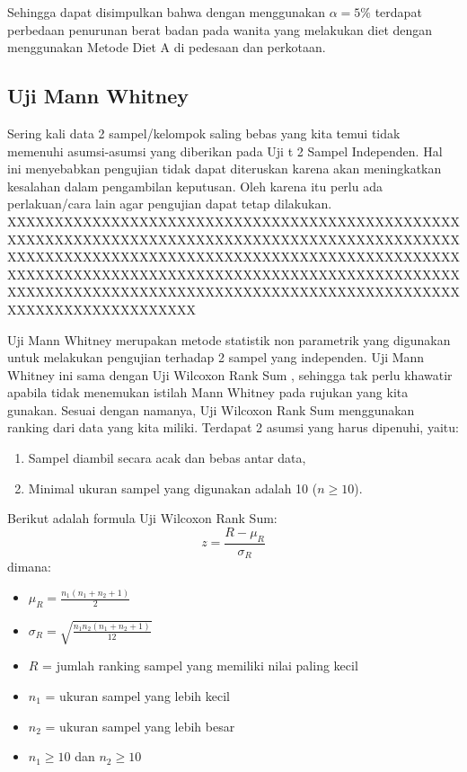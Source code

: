 \documentclass[
]{book}
\providecommand{\tightlist}{%
  \setlength{\itemsep}{0pt}\setlength{\parskip}{0pt}}
\begin{document}
Sehingga dapat disimpulkan bahwa dengan menggunakan \(\alpha = 5\%\) terdapat perbedaan penurunan berat badan pada wanita yang melakukan diet dengan menggunakan Metode Diet A di pedesaan dan perkotaan.

\hypertarget{uji-mann-whitney}{%
\subsection{Uji Mann Whitney}\label{uji-mann-whitney}}

Sering kali data 2 sampel/kelompok saling bebas yang kita temui tidak memenuhi asumsi-asumsi yang diberikan pada Uji t 2 Sampel Independen. Hal ini menyebabkan pengujian tidak dapat diteruskan karena akan meningkatkan kesalahan dalam pengambilan keputusan. Oleh karena itu perlu ada perlakuan/cara lain agar pengujian dapat tetap dilakukan. XXXXXXXXXXXXXXXXXXXXXXXXXXXXXXXXXXXXXXXXXXXXXXXXXXXXXXXXXXXXXXXXXXXXXXXXXXXXXXXXXXXXXXXXXXXXXXXXXXXXXXXXXXXXXXXXXXXXXXXXXXXXXXXXXXXXXXXXXXXXXXXXXXXXXXXXXXXXXXXXXXXXXXXXXXXXXXXXXXXXXXXXXXXXXXXXXXXXXXXXXXXXXXXXXXXXXXXXXXXXXXXXXXXXXXXXXXXXXXXXXXXXXXXXXXXXXXXXXXXX

Uji Mann Whitney merupakan metode statistik non parametrik yang digunakan untuk melakukan pengujian terhadap 2 sampel yang independen. Uji Mann Whitney ini sama dengan Uji Wilcoxon Rank Sum \citep{chalmer19}, sehingga tak perlu khawatir apabila tidak menemukan istilah Mann Whitney pada rujukan yang kita gunakan. Sesuai dengan namanya, Uji Wilcoxon Rank Sum menggunakan ranking dari data yang kita miliki. Terdapat 2 asumsi yang harus dipenuhi, yaitu:

\begin{enumerate}
\def\labelenumi{\arabic{enumi}.}
\tightlist
\item
  Sampel diambil secara acak dan bebas antar data,
\item
  Minimal ukuran sampel yang digunakan adalah 10 (\(n \geq 10\)). \citep{allan18}
\end{enumerate}

Berikut adalah formula Uji Wilcoxon Rank Sum:
\[
z = \frac{R-\mu_R}{\sigma_R}
\]
dimana:

\begin{itemize}
\tightlist
\item
  \(\mu_R=\frac{n_1(n_1+n_2+1)}{2}\)
\item
  \(\sigma_R=\sqrt{\frac{n_1 n_2 (n_1+n_2+1)}{12}}\)
\item
  \(R\) = jumlah ranking sampel yang memiliki nilai paling kecil
\item
  \(n_1\) = ukuran sampel yang lebih kecil
\item
  \(n_2\) = ukuran sampel yang lebih besar
\item
  \(n_1 \geq 10\) dan \(n_2 \geq 10\)
\end{itemize}
\end{document}
